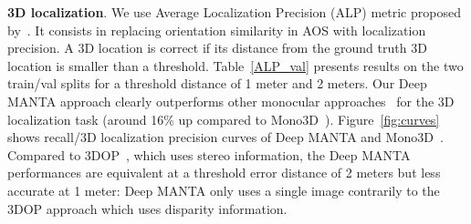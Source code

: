 \documentclass[10pt,twocolumn,letterpaper]{article}
\begin{document}
\textbf{3D localization}. We use Average Localization Precision (ALP) metric proposed by~\cite{3dvp}. It consists in replacing orientation similarity in AOS with localization precision. A 3D location is correct if its distance from the ground truth 3D location is smaller than a threshold. Table~\ref{ALP_val} presents results on the two train/val splits for a threshold distance of 1 meter and 2 meters. Our Deep MANTA approach clearly outperforms other monocular approaches~\cite{mono3d,3dvp} for the 3D localization task (around 16\% up compared to Mono3D~\cite{mono3d}). Figure~\ref{fig:curves} shows recall/3D localization precision curves of Deep MANTA and Mono3D~\cite{mono3d}. Compared to 3DOP~\cite{3dop}, which uses stereo information, the Deep MANTA performances are equivalent at a threshold error distance of 2 meters but less accurate at 1 meter: Deep MANTA only uses a single image contrarily to the 3DOP approach which uses disparity information.
\end{document}
